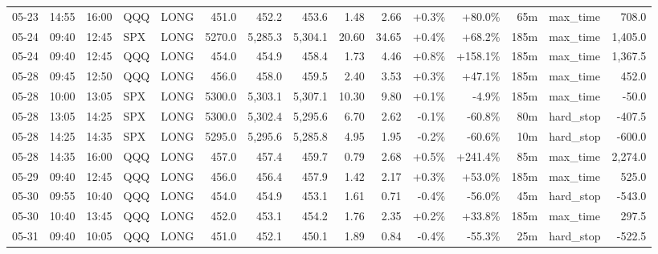 \documentclass[11pt,a4paper,twoside]{article}
\begin{document}
\begin{landscape}
\begin{center}
\begin{longtable}{>{\color{txtmain}}l l l l l r r r r r r r r >{\color{txtmain}}l r}
05-23 & 14:55 & 16:00 & QQQ & LONG & 451.0 & 452.2 & 453.6 & 1.48 & 2.66 & \textcolor{wingreen}{+0.3\%} & \textcolor{wingreen}{+80.0\%} & 65m & max\_time & \textcolor{wingreen}{708.0} \\
05-24 & 09:40 & 12:45 & SPX & LONG & 5270.0 & 5,285.3 & 5,304.1 & 20.60 & 34.65 & \textcolor{wingreen}{+0.4\%} & \textcolor{wingreen}{+68.2\%} & 185m & max\_time & \textcolor{wingreen}{1,405.0} \\
05-24 & 09:40 & 12:45 & QQQ & LONG & 454.0 & 454.9 & 458.4 & 1.73 & 4.46 & \textcolor{wingreen}{+0.8\%} & \textcolor{wingreen}{+158.1\%} & 185m & max\_time & \textcolor{wingreen}{1,367.5} \\
05-28 & 09:45 & 12:50 & QQQ & LONG & 456.0 & 458.0 & 459.5 & 2.40 & 3.53 & \textcolor{wingreen}{+0.3\%} & \textcolor{wingreen}{+47.1\%} & 185m & max\_time & \textcolor{wingreen}{452.0} \\
05-28 & 10:00 & 13:05 & SPX & LONG & 5300.0 & 5,303.1 & 5,307.1 & 10.30 & 9.80 & \textcolor{wingreen}{+0.1\%} & \textcolor{lossred}{-4.9\%} & 185m & max\_time & \textcolor{lossred}{-50.0} \\
05-28 & 13:05 & 14:25 & SPX & LONG & 5300.0 & 5,302.4 & 5,295.6 & 6.70 & 2.62 & \textcolor{lossred}{-0.1\%} & \textcolor{lossred}{-60.8\%} & 80m & hard\_stop & \textcolor{lossred}{-407.5} \\
05-28 & 14:25 & 14:35 & SPX & LONG & 5295.0 & 5,295.6 & 5,285.8 & 4.95 & 1.95 & \textcolor{lossred}{-0.2\%} & \textcolor{lossred}{-60.6\%} & 10m & hard\_stop & \textcolor{lossred}{-600.0} \\
05-28 & 14:35 & 16:00 & QQQ & LONG & 457.0 & 457.4 & 459.7 & 0.79 & 2.68 & \textcolor{wingreen}{+0.5\%} & \textcolor{wingreen}{+241.4\%} & 85m & max\_time & \textcolor{wingreen}{2,274.0} \\
05-29 & 09:40 & 12:45 & QQQ & LONG & 456.0 & 456.4 & 457.9 & 1.42 & 2.17 & \textcolor{wingreen}{+0.3\%} & \textcolor{wingreen}{+53.0\%} & 185m & max\_time & \textcolor{wingreen}{525.0} \\
05-30 & 09:55 & 10:40 & QQQ & LONG & 454.0 & 454.9 & 453.1 & 1.61 & 0.71 & \textcolor{lossred}{-0.4\%} & \textcolor{lossred}{-56.0\%} & 45m & hard\_stop & \textcolor{lossred}{-543.0} \\
05-30 & 10:40 & 13:45 & QQQ & LONG & 452.0 & 453.1 & 454.2 & 1.76 & 2.35 & \textcolor{wingreen}{+0.2\%} & \textcolor{wingreen}{+33.8\%} & 185m & max\_time & \textcolor{wingreen}{297.5} \\
05-31 & 09:40 & 10:05 & QQQ & LONG & 451.0 & 452.1 & 450.1 & 1.89 & 0.84 & \textcolor{lossred}{-0.4\%} & \textcolor{lossred}{-55.3\%} & 25m & hard\_stop & \textcolor{lossred}{-522.5} \\

\end{longtable}
\end{center}
\end{landscape}
\end{document}
